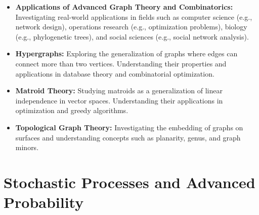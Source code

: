 \documentclass[openany]{book}
\begin{document}
\begin{itemize}
    \item \textbf{Applications of Advanced Graph Theory and Combinatorics:} Investigating real-world applications in fields such as computer science (e.g., network design), operations research (e.g., optimization problems), biology (e.g., phylogenetic trees), and social sciences (e.g., social network analysis).
    \item \textbf{Hypergraphs:} Exploring the generalization of graphs where edges can connect more than two vertices. Understanding their properties and applications in database theory and combinatorial optimization.
    \item \textbf{Matroid Theory:} Studying matroids as a generalization of linear independence in vector spaces. Understanding their applications in optimization and greedy algorithms.
    \item \textbf{Topological Graph Theory:} Investigating the embedding of graphs on surfaces and understanding concepts such as planarity, genus, and graph minors.
\end{itemize}
\section{Stochastic Processes and Advanced Probability}
\end{document}

